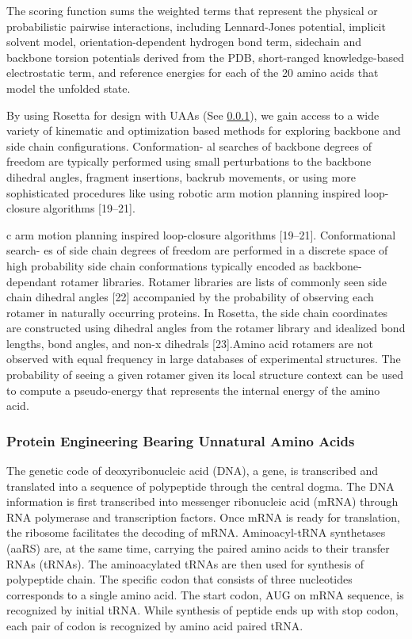 \begin{refsection}
The scoring function sums the weighted terms that represent the physical or
probabilistic pairwise interactions\cite{Rohl2004}, including Lennard-Jones
potential, implicit solvent model\cite{Lazaridis1999}, orientation-dependent
hydrogen bond term\cite{Kortemme2003}, sidechain and backbone torsion
potentials derived from the PDB, short-ranged knowledge-based electrostatic
term, and reference energies for each of the 20 amino acids that model the
unfolded state.

By using Rosetta for design with UAAs (See \ref{sec:uaa-intro}), we gain access to a
wide variety of kinematic and optimization based methods for exploring backbone
and side chain configurations. Conformation- al searches of backbone degrees of
freedom are typically performed using small perturbations to the backbone
dihedral angles, fragment insertions, backrub movements, or using more
sophisticated procedures like using robotic arm motion planning inspired
loop-closure algorithms [19–21].

c arm motion planning inspired loop-closure algorithms [19–21]. Conformational
search- es of side chain degrees of freedom are performed in a discrete space
of high probability side chain conformations typically encoded as
backbone-dependant rotamer libraries. Rotamer libraries are lists of commonly
seen side chain dihedral angles [22] accompanied by the probability of
observing each rotamer in naturally occurring proteins. In Rosetta, the side
chain coordinates are constructed using dihedral angles from the rotamer
library and idealized bond lengths, bond angles, and non-x dihedrals [23].Amino
acid rotamers are not observed with equal frequency in large databases of
experimental structures. The probability of seeing a given rotamer given its
local structure context can be used to compute a pseudo-energy that represents
the internal energy of the amino acid.

\subsubsection{Protein Engineering Bearing Unnatural Amino Acids}
\label{sec:uaa-intro}

The genetic code of deoxyribonucleic acid (DNA), a gene, is transcribed and
translated into a sequence of polypeptide through the central
dogma\cite{CRICK1970}. The DNA information is first transcribed into messenger
ribonucleic acid (mRNA) through RNA polymerase and transcription factors. Once
mRNA is ready for translation, the ribosome facilitates the decoding of mRNA.
Aminoacyl-tRNA synthetases (aaRS) are, at the same time, carrying the paired
amino acids to their transfer RNAs (tRNAs). The aminoacylated tRNAs are then
used for synthesis of polypeptide chain. The specific codon that consists of
three nucleotides corresponds to a single amino acid. The start codon, AUG on
mRNA sequence, is recognized by initial tRNA. While synthesis of peptide ends
up with stop codon, each pair of codon is recognized by amino acid paired
tRNA\cite{Sadava2006}.


\end{refsection}
